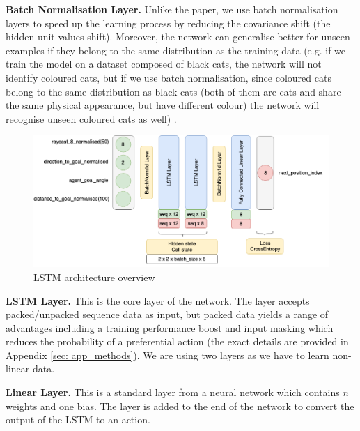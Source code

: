\textbf{Batch Normalisation Layer.} Unlike the paper, we use batch normalisation layers to speed up the learning process by reducing the covariance shift (the hidden unit values shift). Moreover, the network can generalise better for unseen examples if they belong to the same distribution as the training data (e.g. if we train the model on a dataset composed of black cats, the network will not identify coloured cats, but if we use batch normalisation, since coloured cats belong to the same distribution as black cats (both of them are cats and share the same physical appearance, but have different colour) the network will recognise unseen coloured cats as well) \cite{ioffe2015batch}.

\begin{figure}[h!]
    \centerfloat
    \includegraphics[scale=0.45]{images/lstm_kernel.png}
    \caption{LSTM architecture overview}
    \label{fig:lstm_kernel}
\end{figure}

\textbf{LSTM Layer.} This is the core layer of the network. The layer accepts packed/unpacked sequence data as input, but packed data yields a range of advantages including a training performance boost and input masking which reduces the probability of a preferential action (the exact details are provided in Appendix \ref{sec: app_methods}). We are using two layers as we have to learn non-linear data.

\textbf{Linear Layer.} This is a standard layer from a neural network which contains $n$ weights and one bias. The layer is added to the end of the network to convert the output of the LSTM to an action.


